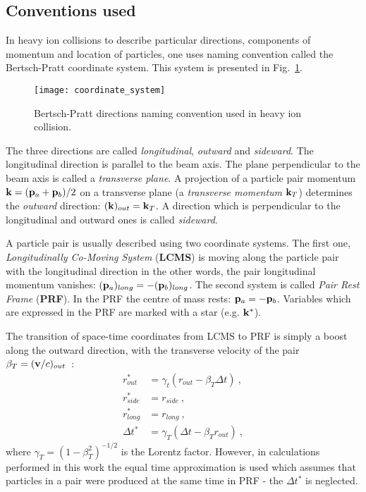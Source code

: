     \subsection{Conventions used}
      In heavy ion collisions to describe particular directions, components of momentum and location of particles, one uses naming convention called the Bertsch-Pratt coordinate system.
      This system is presented in Fig.~\ref{fig:coordinate-system}.
      \begin{figure}[h]
        \centering
        \texttt{[image: coordinate\_system]}
        \caption{Bertsch-Pratt directions naming convention used in heavy ion collision.}
        \label{fig:coordinate-system}
      \end{figure}
      The three directions are called \textit{longitudinal}, \textit{outward} and \textit{sideward}.
      The longitudinal direction is parallel to the beam axis.
      The plane perpendicular to the beam axis is called a \textit{transverse plane}.
      A projection of a particle pair momentum $\mathbf{k} = (\mathbf{p}_a + \mathbf{p}_b)/2$ on a transverse plane (a \textit{transverse momentum} $\mathbf{k}_T$) determines the \textit{outward} direction: $(\mathbf{k})_{out} = \mathbf{k}_T$.
      A direction which is perpendicular to the longitudinal and outward ones is called \textit{sideward}.

      A particle pair is usually described using two coordinate systems.
      The first one, \textit{Longitudinally Co-Moving System} (\textbf{LCMS}) is moving along the particle pair with the longitudinal direction in the other words, the pair longitudinal momentum vanishes: $(\mathbf{p}_a)_{long} = -(\mathbf{p}_b)_{long} $.
      The second system is called \textit{Pair Rest Frame} (\textbf{PRF}).
      In the PRF the centre of mass rests: $\mathbf{p}_a = -\mathbf{p}_b$.
      Variables which are expressed in the PRF are marked with a star (e.g. $\mathbf{k}^{*}$).

      The transition of space-time coordinates from LCMS to PRF is simply a boost along the outward direction, with the transverse velocity of the pair~$\beta_T = (\mathbf{v}/c)_{out}$~\cite{nonidfemto}:
      \begin{align}
        \label{eq:lcmstoprf}
        r^{*}_{out} &= \gamma_{t}(r_{out} - \beta_T \Delta t)~,\\
        r^{*}_{side} &= r_{side}~,\\
        r^{*}_{long} &= r_{long}~,\\
        \Delta t^{*} &= \gamma_T(\Delta t - \beta_T r_{out})~, 
      \end{align}
      where $\gamma_T = (1-\beta^{2}_T)^{-1/2}$ is the Lorentz factor.
      However, in calculations performed in this work the equal time approximation is used which assumes that particles in a pair were produced at the same time in PRF - the $\Delta t^{*}$ is neglected.

